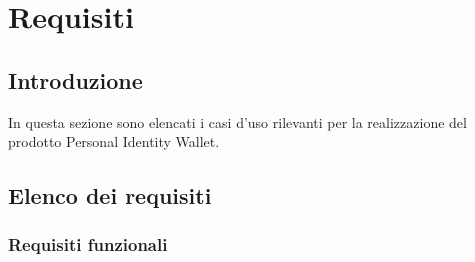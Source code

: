\section{Requisiti}
\subsection{Introduzione}
In questa sezione sono elencati i casi d'uso rilevanti per la realizzazione del prodotto Personal Identity Wallet.
\subsection{Elenco dei requisiti}
\subsubsection*{Requisiti funzionali} %
